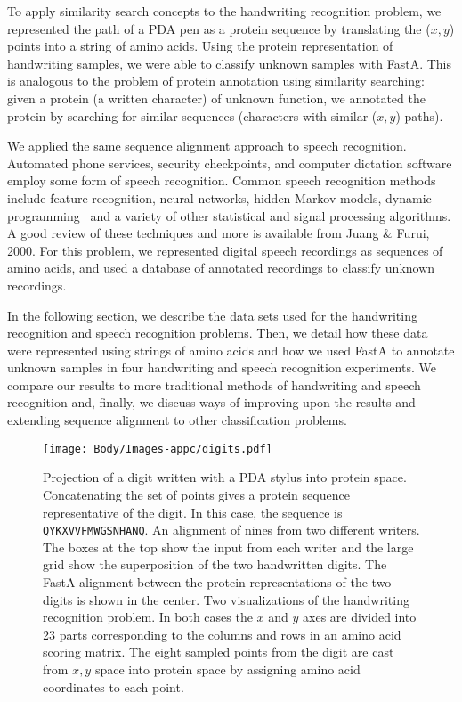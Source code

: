 	To apply similarity search concepts to the handwriting recognition
	problem, we represented the path of a PDA pen as a protein
	sequence by translating the ($x,y$) points into a string of
	amino acids.  Using the protein representation of handwriting
	samples, we were able to classify unknown samples with FastA. 
	This is analogous to the problem of protein annotation using
	similarity searching: given a protein (a written character)
	of unknown function, we annotated the protein by searching for
	similar sequences (characters with similar ($x,y$) paths).

	We applied the same sequence alignment approach to speech
	recognition.  Automated phone services, security checkpoints,
	and computer dictation software employ some form of speech
	recognition.  Common speech recognition methods include feature
	recognition, neural networks, hidden Markov models, dynamic
	programming~\cite{ney2000progress} and a variety of other statistical
	and signal processing algorithms.  A good review of these techniques
	and more is available from Juang \& Furui, 2000.  For this problem,
	we represented digital speech recordings as sequences of amino
	acids, and used a database of annotated recordings to classify
	unknown recordings.

	In the following section, we describe the data sets used for the
	handwriting recognition and speech recognition problems.  Then,
	we detail how these data were represented using strings of amino
	acids and how we used FastA to annotate unknown samples in four
	handwriting and speech recognition experiments.  We compare our
	results to more traditional methods of handwriting and speech
	recognition and, finally, we discuss ways of improving upon the
	results and extending sequence alignment to other classification
	problems.

		\begin{figure}[t!]
				\centering
				\texttt{[image: Body/Images-appc/digits.pdf]}
			\caption{Projection of a digit written with
					a PDA stylus into protein space.
					Concatenating the set of
					points gives a protein sequence
					representative of the digit.
					In this case, the sequence is
					\texttt{QYKXVVFMWGSNHANQ}.%
					An alignment of nines from two
					different writers.  The boxes at
					the top show the input from each
					writer and the large grid show the
					superposition of the two handwritten
					digits.  The FastA alignment between
					the protein representations of the
					two digits is shown in the center.
				Two visualizations of the handwriting
				recognition problem.  In both cases the
				$x$ and $y$ axes are divided into 23 parts
				corresponding to the columns and rows in
				an amino acid scoring matrix.  The eight
				sampled points from the digit are cast from
				$x,y$ space into protein space by assigning
				amino acid coordinates to each point.
			}\label{fig:pda}\label{fig:pdaAlign}
		\end{figure}

